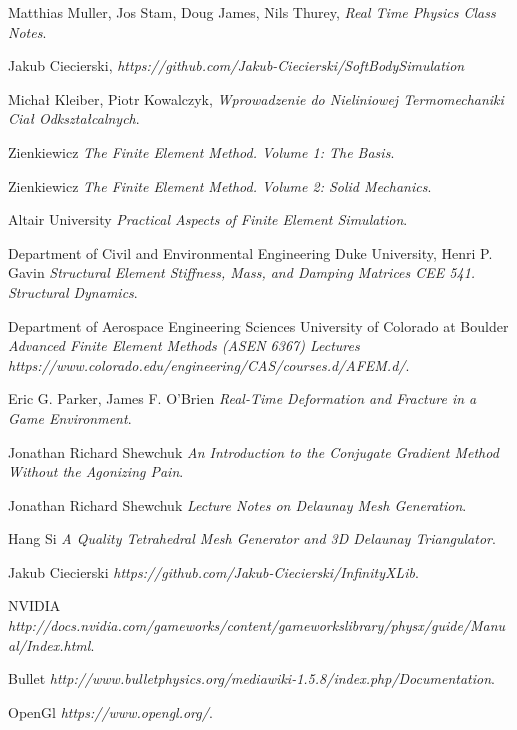 \documentclass[en]{minipw} %
\begin{document}

\begin{thebibliography}{20}%

 Matthias Muller, Jos Stam, Doug James, Nils Thurey, \emph{Real Time Physics Class Notes}.

 Jakub Ciecierski, \emph{https://github.com/Jakub-Ciecierski/SoftBodySimulation}

 Michał Kleiber, Piotr Kowalczyk, \emph{Wprowadzenie do Nieliniowej Termomechaniki Ciał Odkształcalnych}.

 Zienkiewicz \emph{The Finite Element Method. Volume 1: The Basis}.

 Zienkiewicz \emph{The Finite Element Method. Volume 2: Solid Mechanics}.

 Altair University \emph{Practical Aspects of Finite Element Simulation}.

 Department of Civil and Environmental Engineering Duke University, Henri P. Gavin \emph{Structural Element Stiffness, Mass, and Damping Matrices CEE 541. Structural Dynamics}.

 Department of Aerospace Engineering Sciences University of Colorado at Boulder \emph{Advanced Finite Element Methods (ASEN 6367) Lectures https://www.colorado.edu/engineering/CAS/courses.d/AFEM.d/}.

 Eric G. Parker, James F. O'Brien \emph{Real-Time Deformation and Fracture in a Game Environment}.

 Jonathan Richard Shewchuk \emph{An Introduction to the Conjugate Gradient Method Without the Agonizing Pain}.

 Jonathan Richard Shewchuk \emph{Lecture Notes on
Delaunay Mesh Generation}.

 Hang Si \emph{A Quality Tetrahedral Mesh Generator and 3D Delaunay Triangulator}.

 Jakub Ciecierski \emph{https://github.com/Jakub-Ciecierski/InfinityXLib}.

 NVIDIA \emph{http://docs.nvidia.com/gameworks/content/gameworkslibrary/physx/guide/Manual/Index.html}.

 Bullet \emph{http://www.bulletphysics.org/mediawiki-1.5.8/index.php/Documentation}.

 OpenGl \emph{https://www.opengl.org/}.


\end{thebibliography}
\end{document}

